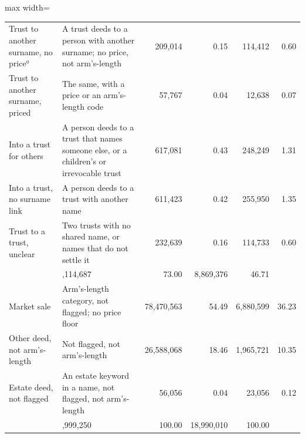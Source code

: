 \begin{table}[!ht]
{\begin{adjustbox}{max width=\textwidth}
\begin{tabular}{>{\raggedright\arraybackslash}p{5.6cm}>{\raggedright\arraybackslash}p{6.8cm}rrrr}
\hspace{1em}Trust to another surname, no price$^{a}$ & A trust deeds to a person with another surname; no price, not arm's-length & 209,014 & 0.15 & 114,412 & 0.60 \\
\hspace{1em}Trust to another surname, priced & The same, with a price or an arm's-length code & 57,767 & 0.04 & 12,638 & 0.07 \\
\hspace{1em}Into a trust for others & A person deeds to a trust that names someone else, or a children's or irrevocable trust & 617,081 & 0.43 & 248,249 & 1.31 \\
\hspace{1em}Into a trust, no surname link & A person deeds to a trust with another name & 611,423 & 0.42 & 255,950 & 1.35 \\
\hspace{1em}Trust to a trust, unclear & Two trusts with no shared name, or names that do not settle it & 232,639 & 0.16 & 114,733 & 0.60 \\
\addlinespace\multicolumn{2}{l}{\emph{D. Not flagged}} & 105,114,687 & 73.00 & 8,869,376 & 46.71 \\
\hspace{1em}Market sale & Arm's-length category, not flagged; no price floor & 78,470,563 & 54.49 & 6,880,599 & 36.23 \\
\hspace{1em}Other deed, not arm's-length & Not flagged, not arm's-length & 26,588,068 & 18.46 & 1,965,721 & 10.35 \\
\hspace{1em}Estate deed, not flagged & An estate keyword in a name, not flagged, not arm's-length & 56,056 & 0.04 & 23,056 & 0.12 \\
\midrule
\multicolumn{2}{l}{All deed events} & 143,999,250 & 100.00 & 18,990,010 & 100.00 \\
\bottomrule\end{tabular}\end{adjustbox}}
\begin{minipage}{0.98\textwidth}\end{minipage}
\end{table}
